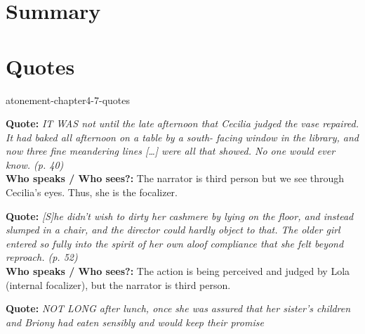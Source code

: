 \documentclass[preview]{standalone}
\begin{document}
\genpage

\section{Summary}

\section{Quotes}

\begin{snippet}{atonement-chapter4-7-quotes}
\begin{minipage}[l]{0.05\textwidth}
\end{minipage}
\begin{minipage}[r]{0.95\textwidth}
    \textbf{Quote:} \textit{
        IT WAS not until the late afternoon that
        Cecilia judged the vase repaired. It had
        baked all afternoon on a table by a south-
        facing window in the library, and now three
        fine meandering lines […] were all that
        showed. No one would ever know. (p. 40)
    }
    \\
    \textbf{Who speaks / Who sees?:}
    The narrator is third person but we see through Cecilia's eyes.
    Thus, she is the focalizer.
\end{minipage}
\hr
\begin{minipage}[l]{0.05\textwidth}
\end{minipage}
\begin{minipage}[r]{0.95\textwidth}
    \textbf{Quote:} \textit{
        [S]he didn't wish to dirty her cashmere by
        lying on the floor, and instead slumped in a
        chair, and the director could hardly object to
        that. The older girl entered so fully into the
        spirit of her own aloof compliance that she
        felt beyond reproach. (p. 52)
    }
    \\
    \textbf{Who speaks / Who sees?:}
    The action is being perceived and judged by Lola (internal focalizer),
    but the narrator is third person.
\end{minipage}
\hr
\begin{minipage}[l]{0.05\textwidth}
\end{minipage}
\begin{minipage}[r]{0.95\textwidth}
    \textbf{Quote:} \textit{
        NOT LONG after lunch, once she was assured
        that her sister's children and Briony had
        eaten sensibly and would keep their promise
}
\end{minipage}
\end{snippet}
\end{document}
